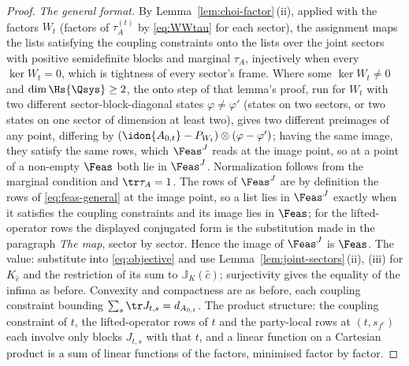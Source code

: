 \begin{proof}
\emph{The general format.} By Lemma~\ref{lem:choi-factor}\,(ii), applied with
the factors $W_t$ (factors of $\tau^{(t)}_A$ by \eqref{eq:WWtau} for each
sector), the assignment maps the lists satisfying the coupling constraints
onto the lists over the joint sectors with positive semidefinite blocks and
marginal $\tau_A$, injectively when every $\ker W_t=0$, which is
tightness of every sector's frame. Where some $\ker W_t\ne0$ and
$\dim\Hs{\Qsys}\ge2$, the onto step of that lemma's proof, run for $W_t$
with two different sector-block-diagonal states $\varphi\ne\varphi'$ (states
on two sectors, or two states on one sector of dimension at least two), gives
two different preimages of any point, differing by
$(\idon{A_{0,t}}-P_{W_t})\otimes(\varphi-\varphi')$; having the same
image, they satisfy the same rows, which $\Feas^{J}$ reads at the image
point, so at a point of a non-empty $\Feas$ both lie in $\Feas^{J}$.
Normalization follows from the marginal
condition and $\tr\tau_A=1$. The rows of $\Feas^{J}$ are by definition the
rows of \eqref{eq:feas-general} at the image point, so a list lies in
$\Feas^{J}$ exactly when it satisfies the coupling constraints and its image
lies in $\Feas$; for the lifted-operator rows the displayed conjugated form
is the substitution made in the paragraph \emph{The map}, sector by sector. Hence the image of
$\Feas^{J}$ is $\Feas$. The value: substitute into \eqref{eq:objective} and
use Lemma~\ref{lem:joint-sectors}\,(ii), (iii) for $K_{\hat c}$ and the
restriction of its sum to $\mathbb{J}_K(\hat c)$; surjectivity gives the
equality of the infima as before. Convexity and compactness are as before,
each coupling constraint bounding $\sum_s\tr J_{t,s}=d_{A_{0,t}}$. The
product structure: the coupling constraint of $t$, the lifted-operator rows
of $t$ and the party-local rows at $(t,s_{f^c})$ each involve only blocks
$J_{t,s}$ with that $t$, and a linear function on a Cartesian product is a
sum of linear functions of the factors, minimised factor by factor.
\end{proof}
